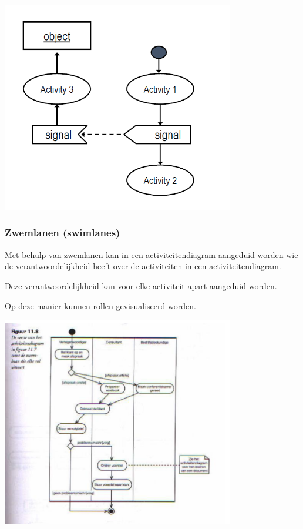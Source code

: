 \begin{center}
\includegraphics[width=4in]{img/signals}%
\end{center}
\newpage
\subsubsection{Zwemlanen (swimlanes)}

Met behulp van zwemlanen kan in een activiteitendiagram aangeduid worden wie de verantwoordelijkheid heeft over de activiteiten in een activiteitendiagram. 

Deze verantwoordelijkheid kan voor elke activiteit apart aangeduid worden. 

Op deze manier kunnen rollen gevisualiseerd worden.


\begin{center}
\includegraphics[width=4in]{img/swimlanes}%
\end{center}
\newpage
